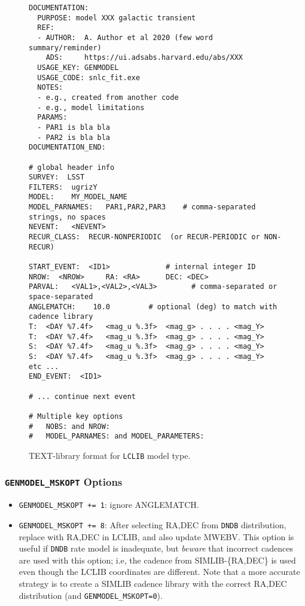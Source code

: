 \documentclass[12pt]{article}
\begin{document}
\begin{figure}    
\begin{center}
\begin{verbatim}
DOCUMENTATION:
  PURPOSE: model XXX galactic transient
  REF: 
  - AUTHOR:  A. Author et al 2020 (few word summary/reminder) 
    ADS:     https://ui.adsabs.harvard.edu/abs/XXX
  USAGE_KEY: GENMODEL 
  USAGE_CODE: snlc_fit.exe  
  NOTES:
  - e.g., created from another code
  - e.g., model limitations
  PARAMS:
  - PAR1 is bla bla
  - PAR2 is bla bla
DOCUMENTATION_END:

# global header info
SURVEY:  LSST
FILTERS:  ugrizY
MODEL:    MY_MODEL_NAME
MODEL_PARNAMES:   PAR1,PAR2,PAR3    # comma-separated strings, no spaces
NEVENT:   <NEVENT>
RECUR_CLASS:  RECUR-NONPERIODIC  (or RECUR-PERIODIC or NON-RECUR)

START_EVENT:  <ID1>             # internal integer ID
NROW:  <NROW>     RA: <RA>      DEC: <DEC>
PARVAL:   <VAL1>,<VAL2>,<VAL3>        # comma-separated or space-separated 
ANGLEMATCH:    10.0         # optional (deg) to match with cadence library
T:  <DAY %7.4f>   <mag_u %.3f>  <mag_g> . . . . <mag_Y>
T:  <DAY %7.4f>   <mag_u %.3f>  <mag_g> . . . . <mag_Y>
S:  <DAY %7.4f>   <mag_u %.3f>  <mag_g> . . . . <mag_Y>
S:  <DAY %7.4f>   <mag_u %.3f>  <mag_g> . . . . <mag_Y>
etc ...
END_EVENT:  <ID1>

# ... continue next event

# Multiple key options
#   NOBS: and NROW: 
#   MODEL_PARNAMES: and MODEL_PARAMETERS:
\end{verbatim}
\end{center}
\caption{ TEXT-library format for {\tt LCLIB} model type. }
\label{fig:LCLIB_format}
\end{figure}

\subsubsection{{\tt GENMODEL\_MSKOPT} Options}
\label{sss:LCLIB_options}

\begin{itemize}
  \item {\tt GENMODEL\_MSKOPT += 1}: ignore ANGLEMATCH.   
  \item {\tt GENMODEL\_MSKOPT += 8}: 
     After selecting RA,DEC from {\tt DNDB} distribution, replace 
     with RA,DEC in LCLIB, and also update MWEBV. This option is
     useful if {\tt DNDB} rate model is inadequate,
     but {\it beware} that incorrect cadences are used with this option;
     i.e, the cadence from SIMLIB-\{RA,DEC\} is used even
     though the LCLIB coordinates are different.
     Note that a more accurate strategy is to create a 
     SIMLIB cadence library with the correct RA,DEC distribution
     (and {\tt GENMODEL\_MSKOPT=0}).
\end{itemize}
\end{document}
